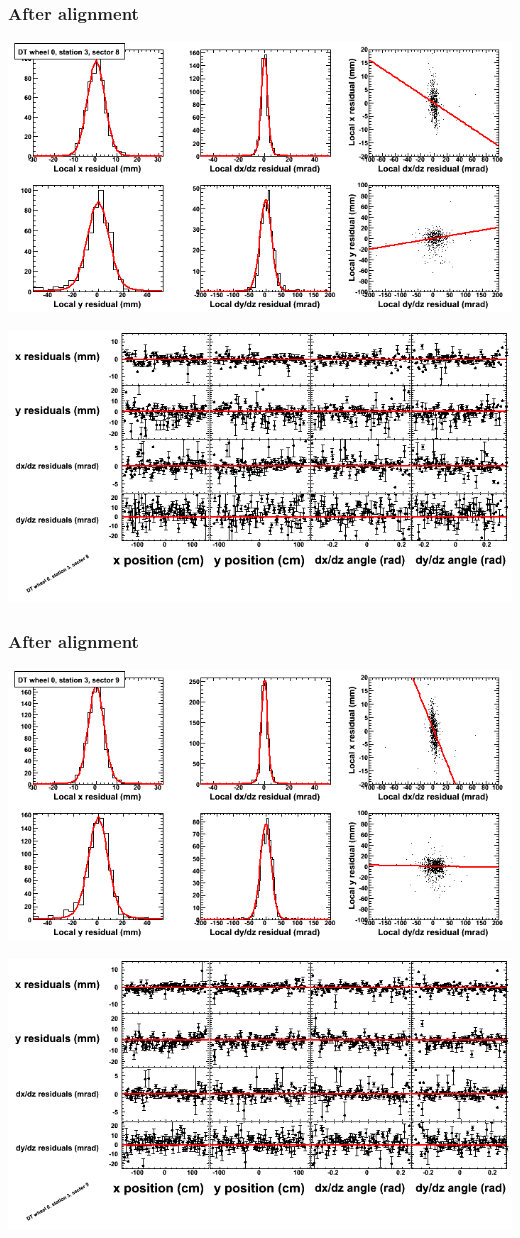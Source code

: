 \documentclass[compress]{beamer}
\begin{document}
\begin{frame}
\frametitle{After alignment}
\includegraphics[width=0.7\linewidth]{NOV4_fitfunctions/MBwhCst3sec08_bellcurves.png}

\includegraphics[width=0.7\linewidth]{NOV4_fitfunctions/MBwhCst3sec08_polynomials.png}
\end{frame}

\begin{frame}
\frametitle{After alignment}
\includegraphics[width=0.7\linewidth]{NOV4_fitfunctions/MBwhCst3sec09_bellcurves.png}

\includegraphics[width=0.7\linewidth]{NOV4_fitfunctions/MBwhCst3sec09_polynomials.png}
\end{frame}
\end{document}
